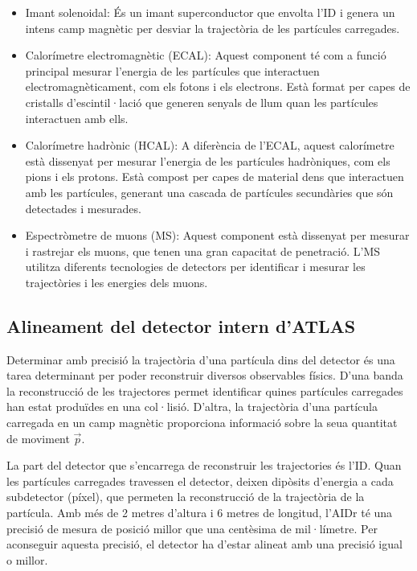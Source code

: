 \begin{itemize}
\item Imant solenoidal: És un imant superconductor que envolta l'ID i genera un intens camp magnètic per desviar
	la trajectòria de les partícules carregades.
	
\item Calorímetre electromagnètic (ECAL): Aquest component té com a funció principal 
	mesurar l'energia de les partícules que interactuen electromagnèticament, com els 
	fotons i els electrons. Està format per capes de cristalls d'escintil·lació que generen 
	senyals de llum quan les partícules interactuen amb ells.
	
\item Calorímetre hadrònic (HCAL): A diferència de l'ECAL, aquest calorímetre està 
	dissenyat per mesurar l'energia de les partícules hadròniques, com els pions i 
	els protons. Està compost per capes de material dens que interactuen amb 
	les partícules, generant una cascada de partícules secundàries que 
	són detectades i mesurades.
	
\item Espectròmetre de muons (MS): Aquest component està dissenyat per mesurar i rastrejar 
	els muons, que tenen una gran capacitat de penetració. L'MS utilitza diferents tecnologies 
	de detectors per identificar i mesurar les trajectòries i les energies dels muons.
\end{itemize}




\subsection{Alineament del detector intern d’ATLAS}
\label{chap:resumen_val:Exp:Alignment}
Determinar amb precisió la trajectòria d'una partícula dins del detector
és una tarea determinant per poder reconstruir diversos observables físics. 
D'una banda la reconstrucció de les trajectores permet identificar quines partícules 
carregades han estat produïdes en una col·lisió. D'altra, la trajectòria 
d'una partícula carregada en un camp magnètic proporciona informació sobre 
la seua quantitat de moviment $\overrightarrow{p}$.

La part del detector que s'encarrega de reconstruir les trajectories és l'ID.
Quan les partícules carregades travessen el detector, deixen dipòsits d'energia a 
cada subdetector (píxel), que permeten la reconstrucció de la trajectòria de la partícula. 
Amb més de 2 metres d'altura i 6 metres de longitud, l'AIDr té una precisió de mesura 
de posició millor que una centèsima de mil·límetre.  Per aconseguir aquesta precisió, 
el detector ha d'estar alineat amb una precisió igual o millor.

